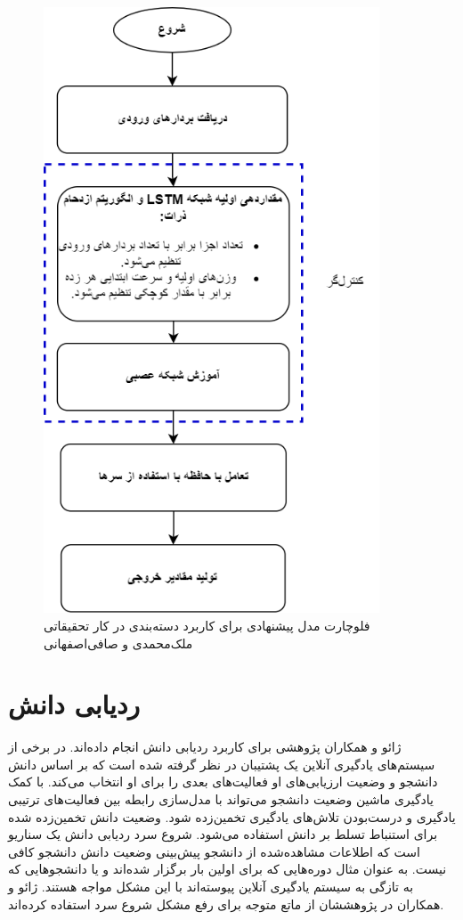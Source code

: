 \begin{figure}[!h]
\begin{center}
\includegraphics[height=18cm]{PSO-NTM.png}
\end{center}
\caption{فلوچارت مدل پیشنهادی برای کاربرد دسته‌بندی در کار تحقیقاتی ملک‌محمدی و صافی‌اصفهانی \cite{faradonbe2020classifier}} 
\end{figure}

\section{ردیابی دانش}
ژائو و همکاران پژوهشی برای کاربرد ردیابی دانش انجام داده‌اند. در برخی از سیستم‌های یادگیری آنلاین یک پشتیبان در نظر گرفته شده است که بر اساس دانش دانشجو و وضعیت ارزیابی‌های او فعالیت‌های بعدی را برای او انتخاب می‌کند. با کمک یادگیری ماشین وضعیت دانشجو می‌تواند با مدل‌سازی رابطه بین فعالیت‌های ترتیبی یادگیری و درست‌بودن تلاش‌های یادگیری تخمین‌زده شود. وضعیت دانش تخمین‌زده شده برای استنباط تسلط بر دانش استفاده می‌شود. شروع سرد ردیابی دانش یک سناریو است که اطلاعات مشاهده‌شده از دانشجو پیش‌بینی وضعیت دانش دانشجو کافی نیست. به عنوان مثال دوره‌هایی که برای اولین بار برگزار شده‌اند و یا دانشجوهایی که به تازگی به سیستم یادگیری آنلاین پیوسته‌اند با این مشکل مواجه هستند. ژائو و همکاران در پژوهششان از ماتع متوجه برای رفع مشکل شروع سرد استفاده کرده‌اند.\cite{zhao2020cold}




